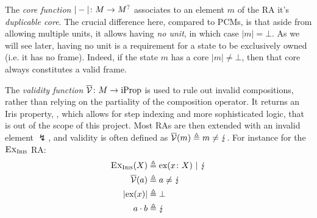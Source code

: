 The \emph{core function} $|-|\colon M\rightarrow M^?$ associates to an element $m$ of the RA it's \emph{duplicable core}. The crucial difference here, compared to PCMs, is that aside from allowing multiple units, it allows having \emph{no unit}, in which case $|m|=\bot$. As we will see later, having no unit is a requirement for a state to be exclusively owned (i.e. it has no frame). Indeed, if the state $m$ has a core $|m|\neq\bot$, then that core always constitutes a valid frame.

The \emph{validity function} $\overline{\cal V}\colon M\rightarrow \text{iProp}$ is used to rule out invalid compositions, rather than relying on the partiality of the composition operator. It returns an Iris property, , which allows for step indexing and more sophisticated logic, that is out of the scope of this project. Most RAs are then extended with an invalid element $\lightning$, and validity is often defined as $\overline{\cal V}(m)\triangleq m\neq \lightning$. For instance for the $\textsc{Ex}_{\textsc{Iris}}$ RA: \begin{align*}
	\textsc{Ex}_{\textsc{Iris}}(X) &\triangleq \text{ex}(x\colon X) ~|~ \lightning \\
	\overline{\cal V}(a) &\triangleq a \neq \lightning \\
	|\text{ex}(x)| &\triangleq \bot\\
	a \cdot b &\triangleq \lightning
\end{align*}

